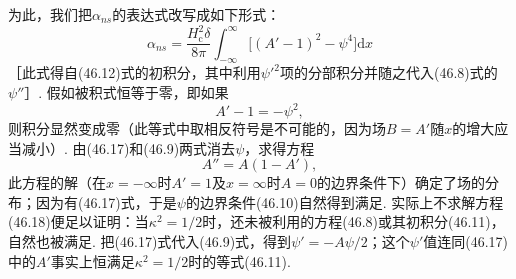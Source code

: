 为此，我们把$\alpha_{ns}$的表达式改写成如下形式：
\begin{equation}
\alpha_{ns}=\frac{H_{\mathrm{c}}^2\delta}{8\pi}\int_{-\infty}^{\infty}
\bigl[(A'-1)^2-\psi^4\bigr]\mathrm{d}x
\end{equation}
［此式得自(46.12)式的初积分，其中利用$\psi'^2$项的分部积分并随之代入(46.8)式的$\psi''$］. 假如被积式恒等于零，即如果
\begin{equation}
A'-1=-\psi^2,
\end{equation}
则积分显然变成零（此等式中取相反符号是不可能的，因为场$B=A'$随$x$的增大应当减小）. 由(46.17)和(46.9)两式消去$\psi$，求得方程
\begin{equation}
A''=A(1-A'),
\end{equation}
此方程的解（在$x=-\infty$时$A'=1$及$x=\infty$时$A=0$的边界条件下）确定了场的分布；因为有(46.17)式，于是$\psi$的边界条件(46.10)自然得到满足. 实际上不求解方程(46.18)便足以证明：当$\kappa^2=1/2$时，还未被利用的方程(46.8)或其初积分(46.11)，自然也被满足. 把(46.17)式代入(46.9)式，得到$\psi'=-A\psi/2$；这个$\psi'$值连同(46.17)中的$A'$事实上恒满足$\kappa^2=1/2$时的等式(46.11).

